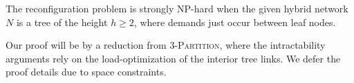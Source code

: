 \documentclass[sigconf]{acmart}
\begin{document}

\begin{theorem}
	The reconfiguration problem is strongly NP-hard when the given hybrid network $N$ is a tree of the height $h\ge 2$, where demands just occur between leaf nodes. \label{thm:1}
\end{theorem}

Our proof will be by a reduction from \textsc{$3$-Partition}, where the intractability arguments rely on the load-optimization of the interior tree links. We defer the proof details due to space constraints.
\end{document}
